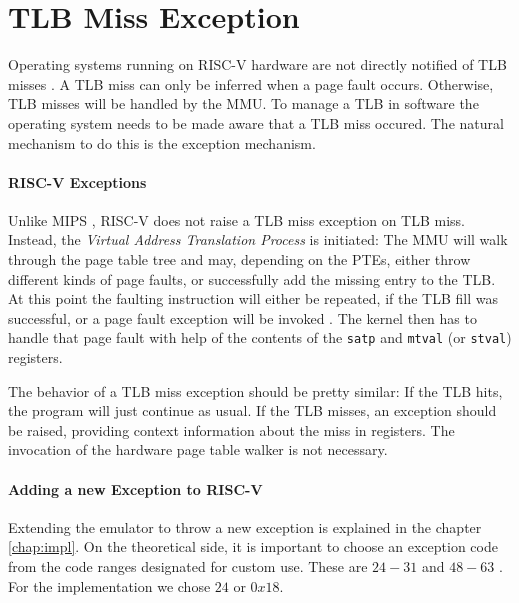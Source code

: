 \section{TLB Miss Exception}
Operating systems running on RISC-V hardware are not directly notified of TLB misses \cite{RISCVInstructionSet}.
A TLB miss can only be inferred when a page fault occurs. Otherwise, TLB misses will be handled
by the MMU.
To manage a TLB in software the operating system needs to be made aware that a TLB miss occured.
The natural mechanism to do this is the exception mechanism.

\paragraph{RISC-V Exceptions}
Unlike MIPS \cite{heiserAnatomyHighPerformanceMicrokernel}, RISC-V does not raise a TLB miss exception on TLB miss.
Instead, the \emph{Virtual Address Translation Process} is initiated: The MMU will walk through
the page table tree and may, depending on the PTEs, either throw different kinds of page faults, or
successfully add the missing entry to the TLB.
At this point the faulting instruction will either be repeated, if the TLB fill was successful, or
a page fault exception will be invoked \cite{RISCVInstructionSet}. The kernel then has to handle that page fault with help
of the contents of the \texttt{satp} and \texttt{mtval} (or \texttt{stval}) registers.

The behavior of a TLB miss exception should be pretty similar: If the TLB hits, the program will
just continue as usual. If the TLB misses, an exception should be raised, providing context
information about the miss in registers. The invocation of the hardware page table walker is
not necessary.


\paragraph{Adding a new Exception to RISC-V}
Extending the emulator to throw a new exception is explained in the chapter \ref{chap:impl}.
On the theoretical side, it is important to choose an exception code from the code ranges designated
for custom use. These are $24-31$ and $48-63$ \cite{RISCVInstructionSet}. For the implementation we chose $24$ or $0x18$.



